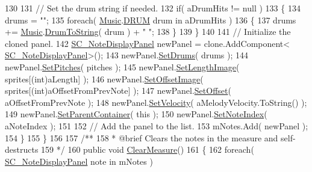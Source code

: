\begin{DoxyCodeInclude}
130 
131             \textcolor{comment}{// Set the drum string if needed.}
132             \textcolor{keywordflow}{if}( aDrumHits != null )
133             \{
134                 drums = \textcolor{stringliteral}{""};
135                 \textcolor{keywordflow}{foreach}( \hyperlink{class_music}{Music}.\hyperlink{group___music_enums_gade475b4382c7066d1af13e7c13c029b6}{DRUM} drum in aDrumHits )
136                 \{
137                     drums += \hyperlink{class_music}{Music}.\hyperlink{group___music_stat_func_gaf5f64ebe9a7e036e07f283e41f26d22b}{DrumToString}( drum ) + \textcolor{stringliteral}{" "};
138                 \}
139             \}
140 
141             \textcolor{comment}{// Initialize the cloned panel.}
142             \hyperlink{class_s_c___note_display_panel}{SC\_NoteDisplayPanel} newPanel = clone.AddComponent<
      \hyperlink{class_s_c___note_display_panel}{SC\_NoteDisplayPanel}>();
143             newPanel.\hyperlink{group___s_c___n_d_p_unity_gae14b5564be204df7699b95186d83f69f}{SetDrums}( drums );
144             newPanel.\hyperlink{group___s_c___n_d_p_unity_gad9bf776f0c51cf6170faccf9fc4ac7e0}{SetPitches}( pitches );
145             newPanel.\hyperlink{group___s_c___n_d_p_unity_ga1a1c4b8111463ec3e134d17fe5064a54}{SetLengthImage}( sprites[(\textcolor{keywordtype}{int})aLength] );
146             newPanel.\hyperlink{group___s_c___n_d_p_unity_gaa0a517d1359cd1ed109a130bd52763f1}{SetOffsetImage}( sprites[(\textcolor{keywordtype}{int})aOffsetFromPrevNote] );
147             newPanel.\hyperlink{group___s_c___n_d_p_unity_ga8ff7588e8c3f59a03842feaff92f97e9}{SetOffset}( aOffsetFromPrevNote );
148             newPanel.\hyperlink{group___s_c___n_d_p_unity_ga8a2fef715606caa884c7b490850fb9b7}{SetVelocity}( aMelodyVelocity.ToString() );
149             newPanel.\hyperlink{group___s_c___n_d_p_unity_gae642b50484b9c7fb2bd3b201aeef726c}{SetParentContainer}( \textcolor{keyword}{this} );
150             newPanel.\hyperlink{group___s_c___n_d_p_unity_gaf3160e3686e44e7718768242438ea1cc}{SetNoteIndex}( aNoteIndex );
151 
152             \textcolor{comment}{// Add the panel to the list.}
153             mNotes.Add( newPanel );
154         \}
155     \}
156 \textcolor{comment}{}
157 \textcolor{comment}{    /**}
158 \textcolor{comment}{     * @brief Clears the notes in the measure and self-destructs}
159 \textcolor{comment}{    */}
160     \textcolor{keyword}{public} \textcolor{keywordtype}{void} \hyperlink{group___s_c___m_d_p_pub_func_ga5c4379bcb1309f70b7406eb6523c6179}{ClearMeasure}()
161     \{
162         \textcolor{keywordflow}{foreach}( \hyperlink{class_s_c___note_display_panel}{SC\_NoteDisplayPanel} note \textcolor{keywordflow}{in} mNotes )

\end{DoxyCodeInclude}
